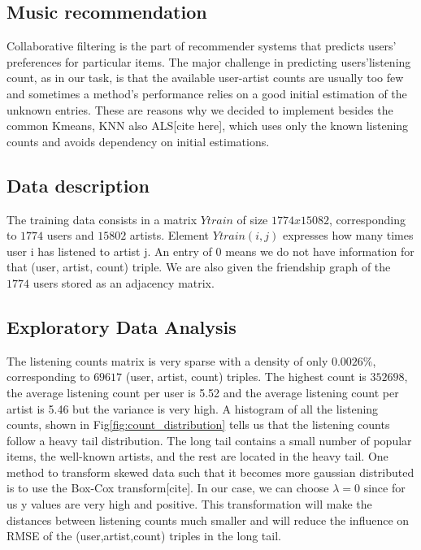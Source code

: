 \subsection{Music recommendation}
Collaborative filtering is the part of recommender systems that predicts users' preferences for particular items. The major challenge in predicting users'listening count, as in our task, is that the available user-artist counts are usually too few and sometimes a method's performance relies on a good initial estimation of the unknown entries. 
These are reasons why we decided to implement besides the common Kmeans, KNN also ALS[cite here], which uses only the known listening counts and avoids dependency on initial estimations.

\subsection{Data description}
The training data consists in a matrix $Ytrain$ of size $1774x15082$, corresponding to $1774$ users and $15802$ artists. Element $Ytrain(i,j)$ expresses how many times user i has listened to artist j. An entry of 0 means we do not have information for that (user, artist, count) triple.
We are also given the friendship graph of the $1774$ users stored as an adjacency matrix.

\subsection{Exploratory Data Analysis}

The listening counts matrix is very sparse with a density of only $0.0026\%$, corresponding to 
$69617$ (user, artist, count) triples.
The highest count is $352698$, the average listening count per user is  5.52 and the average listening count per artist is 5.46 but the variance is very high.
A histogram of all the listening counts, shown in Fig\ref{fig:count_distribution} tells us that the listening counts follow a heavy tail distribution. The long tail contains a small number of popular items, the well-known
artists, and the rest are located in the heavy tail.
One method to transform skewed data such that it becomes more gaussian distributed is to use the Box-Cox transform[cite]. In our case, we can choose $\lambda=0$ since for us  y values are very high and positive. This transformation will make the distances between listening counts much smaller and will reduce the influence on RMSE of the (user,artist,count) triples in the long tail. 

